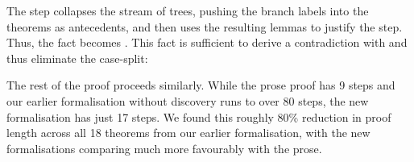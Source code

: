 The  step collapses the stream of trees, pushing the branch labels into the theorems as antecedents, and then uses the resulting lemmas to justify the step. Thus, the fact  becomes . This fact is sufficient to derive a contradiction with  and thus eliminate the case-split:

\vspace{0.2cm}
\noindent{}
\vspace{0.1cm}

The rest of the proof proceeds similarly. While the prose proof has 9 steps and our earlier formalisation without discovery runs to over 80 steps, the new formalisation has just 17 steps. We found this roughly 80\% reduction in proof length across all 18 theorems from our earlier formalisation, with the new formalisations comparing much more favourably with the prose.
